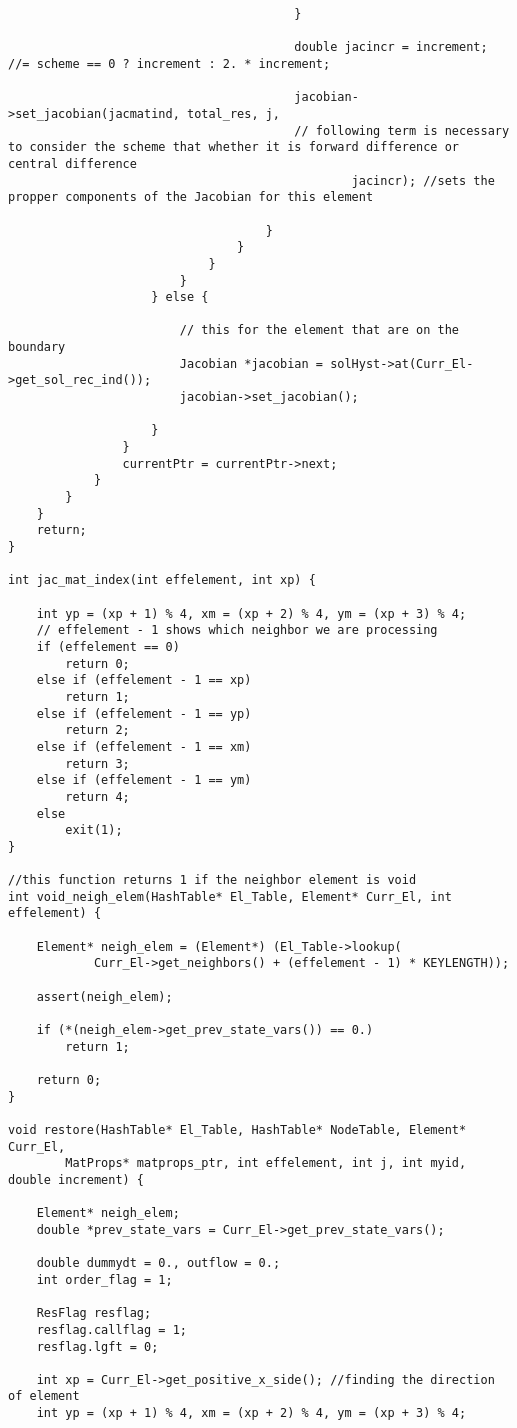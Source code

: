 \documentclass[a4paper,10pt]{article}
\begin{document}
\begin{lstlisting}
										}

										double jacincr = increment; //= scheme == 0 ? increment : 2. * increment;

										jacobian->set_jacobian(jacmatind, total_res, j,
										// following term is necessary to consider the scheme that whether it is forward difference or central difference
												jacincr); //sets the propper components of the Jacobian for this element

									}
								}
							}
						}
					} else {

						// this for the element that are on the boundary
						Jacobian *jacobian = solHyst->at(Curr_El->get_sol_rec_ind());
						jacobian->set_jacobian();

					}
				}
				currentPtr = currentPtr->next;
			}
		}
	}
	return;
}

int jac_mat_index(int effelement, int xp) {

	int yp = (xp + 1) % 4, xm = (xp + 2) % 4, ym = (xp + 3) % 4;
	// effelement - 1 shows which neighbor we are processing
	if (effelement == 0)
		return 0;
	else if (effelement - 1 == xp)
		return 1;
	else if (effelement - 1 == yp)
		return 2;
	else if (effelement - 1 == xm)
		return 3;
	else if (effelement - 1 == ym)
		return 4;
	else
		exit(1);
}

//this function returns 1 if the neighbor element is void
int void_neigh_elem(HashTable* El_Table, Element* Curr_El, int effelement) {

	Element* neigh_elem = (Element*) (El_Table->lookup(
			Curr_El->get_neighbors() + (effelement - 1) * KEYLENGTH));

	assert(neigh_elem);

	if (*(neigh_elem->get_prev_state_vars()) == 0.)
		return 1;

	return 0;
}

void restore(HashTable* El_Table, HashTable* NodeTable, Element* Curr_El,
		MatProps* matprops_ptr, int effelement, int j, int myid, double increment) {

	Element* neigh_elem;
	double *prev_state_vars = Curr_El->get_prev_state_vars();

	double dummydt = 0., outflow = 0.;
	int order_flag = 1;

	ResFlag resflag;
	resflag.callflag = 1;
	resflag.lgft = 0;

	int xp = Curr_El->get_positive_x_side(); //finding the direction of element
	int yp = (xp + 1) % 4, xm = (xp + 2) % 4, ym = (xp + 3) % 4;


\end{lstlisting}
\end{document}
